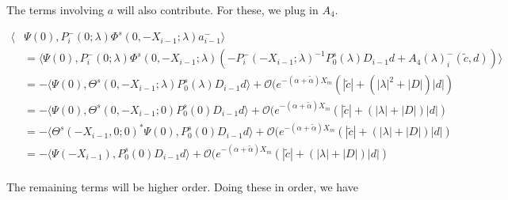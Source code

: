 \documentclass[12pt]{article}
\begin{document}
The terms involving $a$ will also contribute. For these, we plug in $A_4$.

\begin{align*}
\langle &\Psi(0), P_i^-(0; \lambda) \Phi^s(0, -X_{i-1}; \lambda) a_{i-1}^- \rangle \\
&= \langle \Psi(0), P_i^-(0; \lambda) \Phi^s(0, -X_{i-1}; \lambda) (- P_i^-(-X_{i-1}; \lambda)^{-1} P_0^s(\lambda) D_{i-1} d + A_4(\lambda)_i^-(\tilde{c}, d)) \rangle \\
&= -\langle \Psi(0), \Theta^s(0, -X_{i-1}; \lambda) P_0^s(\lambda) D_{i-1} d \rangle + \mathcal{O}( e^{-(\alpha + \tilde{\alpha})X_m}(|\tilde{c}| + (|\lambda|^2 + |D|)|d|) \\
&= -\langle \Psi(0), \Theta^s(0, -X_{i-1}; 0) P_0^s(0) D_{i-1} d \rangle + \mathcal{O}( e^{-(\alpha + \tilde{\alpha})X_m}(|\tilde{c}| + (|\lambda| + |D|)|d|) \\
&= -\langle \Theta^s(-X_{i-1}, 0; 0)^* \Psi(0), P_0^s(0) D_{i-1} d \rangle + \mathcal{O}( e^{-(\alpha + \tilde{\alpha})X_m}(|\tilde{c}| + (|\lambda| + |D|)|d|) \\
&= -\langle \Psi(-X_{i-1}), P_0^s(0) D_{i-1} d \rangle + \mathcal{O}( e^{-(\alpha + \tilde{\alpha})X_m}(|\tilde{c}| + (|\lambda| + |D|)|d|) \\
\end{align*}

The remaining terms will be higher order. Doing these in order, we have
\end{document}
